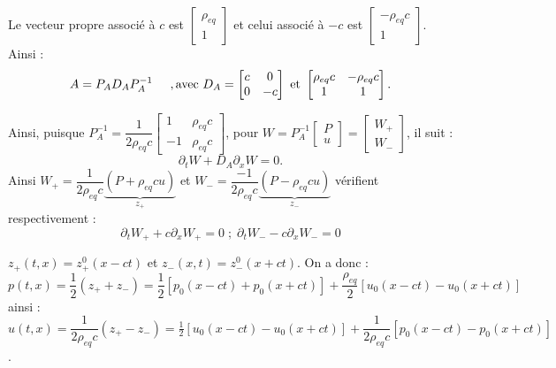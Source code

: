 \documentclass[12pt,a4paper]{article}
\begin{document}
\begin{sol}
\begin{enumerate}
\begin{minipage}[t]{17cm}
			\item Le vecteur propre associé à $c$ est $\begin{bmatrix}
				\rho_{eq}\\
				1
			\end{bmatrix}$ et celui associé à $-c$ est $\begin{bmatrix}
			-\rho_{eq}c\\
			1
			\end{bmatrix}$. Ainsi :
			\[
				A = P_AD_AP_A^{-1}\hspace{.5cm} ,\text{avec } D_A = \begin{bmatrix}
					c & 0\\
					0 & -c
				\end{bmatrix} \text{ et } \begin{bmatrix}
				\rho_{eq} c & -\rho_{eq}c \\
				1 & 1
				\end{bmatrix}.
			\]
		\end{minipage}
		\begin{minipage}{17cm}
			Ainsi, puisque $P_A^{-1} = \dfrac{1}{2\rho_{eq}c}\begin{bmatrix}
				1 & \rho_{eq} c \\
				-1 & \rho_{eq} c
			\end{bmatrix}$, pour $W = P_A^{-1} \begin{bmatrix}
			P \\
			u
			\end{bmatrix} = \begin{bmatrix}
			W_+\\
			W_-
			\end{bmatrix}$, il suit :
			\[
				\partial_t W + D_A \partial_x W =0.
			\]
			Ainsi $W_+ = \dfrac1{2\rho_{eq}c}\underbrace{\left(P+\rho_{eq}cu\right)}_{z_+}$ et $W_- = \dfrac{-1}{2\rho_{eq}c}\underbrace{\left(P-\rho_{eq}cu\right)}_{z_-}$ vérifient respectivement :
			\[
				\partial_t W_+ + c \partial_x W_+ = 0\;;\; \partial_t W_- - c \partial_xW_- = 0
			\]
			
			\item $z_+(t,x) = z_+^0(x-ct)$ et $z_-(x,t) = z_-^0(x+ct)$. On a donc :
			\[
				p(t,x) = \frac12 \left(z_+ + z_-\right) = \frac12 \left[p_0(x-ct)+p_0(x+ct)\right]+\dfrac{\rho_{eq}}2\left[u_0(x-ct)-u_0(x+ct)\right]
			\]
			ainsi : $u(t,x) = \dfrac1{2\rho_{eq}c}(z_+-z_-) = \frac12\left[u_0(x-ct)-u_0(x+ct)\right] + \dfrac{1}{2\rho_{eq}c}\left[p_0(x-ct) - p_0(x+ct)\right]$.
			
			\vspace{.5cm}
			

\end{minipage}
\end{enumerate}
\end{sol}
\end{document}
